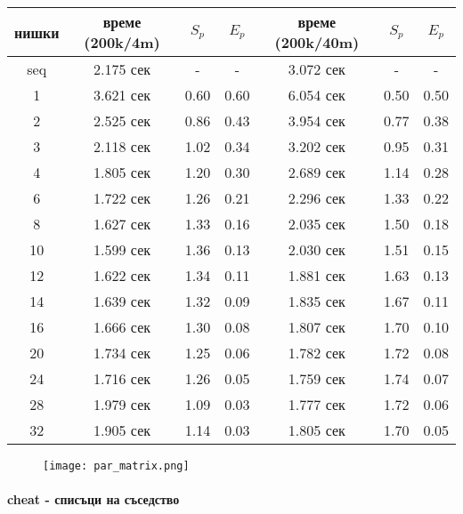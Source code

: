 \begin{center}
\begin{tabular}{ c | c c c | c c c | }
  нишки & време (200k/4m) & $S_p$ & $E_p$ & време (200k/40m) & $S_p$ & $E_p$ \\
  \hline
  seq & 2.175 сек & - & - & 3.072 сек & - & - \\
  1  & 3.621 сек & 0.60 & 0.60 & 6.054 сек & 0.50 &  0.50 \\
  2  & 2.525 сек & 0.86 & 0.43 & 3.954 сек & 0.77 &  0.38 \\
  3  & 2.118 сек & 1.02 & 0.34 & 3.202 сек & 0.95 &  0.31 \\
  4  & 1.805 сек & 1.20 & 0.30 & 2.689 сек & 1.14 &  0.28 \\
  6  & 1.722 сек & 1.26 & 0.21 & 2.296 сек & 1.33 &  0.22 \\
  8  & 1.627 сек & 1.33 & 0.16 & 2.035 сек & 1.50 &  0.18 \\
  10 & 1.599 сек & 1.36 & 0.13 & 2.030 сек & 1.51 &  0.15 \\
  12 & 1.622 сек & 1.34 & 0.11 & 1.881 сек & 1.63 &  0.13 \\
  14 & 1.639 сек & 1.32 & 0.09 & 1.835 сек & 1.67 &  0.11 \\
  16 & 1.666 сек & 1.30 & 0.08 & 1.807 сек & 1.70 &  0.10 \\
  20 & 1.734 сек & 1.25 & 0.06 & 1.782 сек & 1.72 &  0.08 \\
  24 & 1.716 сек & 1.26 & 0.05 & 1.759 сек & 1.74 &  0.07 \\
  28 & 1.979 сек & 1.09 & 0.03 & 1.777 сек & 1.72 &  0.06 \\
  32 & 1.905 сек & 1.14 & 0.03 & 1.805 сек & 1.70 &  0.05 \\
\end{tabular}
\end{center}

\begin{figure}[H]
  \centering
  \texttt{[image: par\_matrix.png]}
\end{figure}

\paragraph*{cheat - списъци на съседство}

